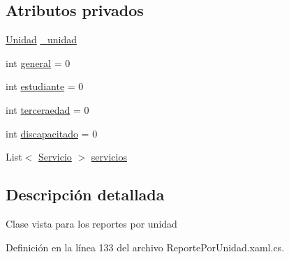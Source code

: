 \subsection*{Atributos privados}
\begin{DoxyCompactItemize}
\item 
\hyperlink{class_proyecto___integrador__3_1_1_tipos_dato_1_1_unidad}{Unidad} \hyperlink{class_proyecto___integrador__3_1_1_reportes_1_1_reporte_por_unidad_1_1_reporte_de_unidad_aab1b6d38fcca26f0ea36a0ef7285d90e}{\-\_\-unidad}
\item 
int \hyperlink{class_proyecto___integrador__3_1_1_reportes_1_1_reporte_por_unidad_1_1_reporte_de_unidad_a9e0e8780e5b3f5f6d09c96c104732388}{general} = 0
\item 
int \hyperlink{class_proyecto___integrador__3_1_1_reportes_1_1_reporte_por_unidad_1_1_reporte_de_unidad_a1f6de144584bd3705d824d4f06dd6cf0}{estudiante} = 0
\item 
int \hyperlink{class_proyecto___integrador__3_1_1_reportes_1_1_reporte_por_unidad_1_1_reporte_de_unidad_a4d2da0add4a77d8ed5cc5c330668a2f5}{terceraedad} = 0
\item 
int \hyperlink{class_proyecto___integrador__3_1_1_reportes_1_1_reporte_por_unidad_1_1_reporte_de_unidad_a8b1b43b2d7a81d3b06a588eac0ecea6f}{discapacitado} = 0
\item 
List$<$ \hyperlink{class_proyecto___integrador__3_1_1_tipos_dato_1_1_servicio}{Servicio} $>$ \hyperlink{class_proyecto___integrador__3_1_1_reportes_1_1_reporte_por_unidad_1_1_reporte_de_unidad_a527d8262f236a73916ca9717fdb1335d}{servicios}
\end{DoxyCompactItemize}


\subsection{Descripción detallada}
Clase vista para los reportes por unidad 



Definición en la línea 133 del archivo Reporte\-Por\-Unidad.\-xaml.\-cs.



